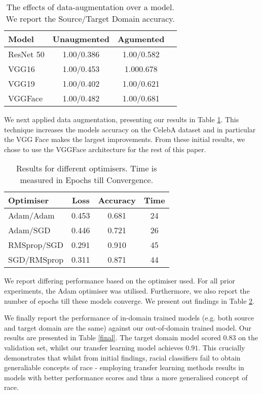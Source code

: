 \documentclass[10pt,twocolumn,letterpaper]{article}
\begin{document}
\begin{table}[h!]
\begin{center}
\begin{tabular}{|l|c|c|c|}
\hline
Model & Unaugmented & Agumented  \\
\hline\hline
ResNet 50 &1.00/0.386  & 1.00/0.582\\
VGG16 & 1.00/0.453 & 1.000.678\\
VGG19  &1.00/0.402 & 1.00/0.621\\
VGGFace & 1.00/0.482 & 1.00/0.681\\
\hline
\end{tabular}
\end{center}
\caption{The effects of data-augmentation over a model. We report the Source/Target Domain accuracy. \label{data agument}}
\end{table}

We next applied data augmentation, presenting our results in Table \ref{data agument}. This technique increases the models accuracy on the CelebA dataset and in particular the VGG Face makes the largest improvements. From these initial results, we chose to use the VGGFace architecture for the rest of this paper.

\begin{table}[h!]
\begin{center}
\begin{tabular}{|l|c|c|c|}
\hline
Optimiser&Loss &Accuracy &Time\\
\hline \hline
Adam/Adam& 0.453 & 0.681 &24\\
Adam/SGD &0.446 & 0.721&26\\
RMSprop/SGD&0.291 & 0.910&45\\
SGD/RMSprop&0.311 & 0.871&44\\
\hline
\end{tabular}
\end{center}
\caption{Results for different optimisers. Time is measured in Epochs till Convergence. \label{Table: Optimiser}}
\end{table}

We report differing performance based on the optimiser used. For all prior experiments, the Adam optimiser was utilised. Furthermore, we also report the number of epochs till these models converge. We present out findings in Table \ref{Table: Optimiser}.

We finally report the performance of in-domain trained models (e.g. both source and target domain are the same) against our out-of-domain trained model. Our results are presented in Table \ref{final}. The target domain model scored $0.83$ on the validation set, whilst our transfer learning model achieves $0.91$. This crucially demonstrates that whilst from initial findings, racial classifiers fail to obtain generaliable concepts of race - employing transfer learning methods results in models with better performance scores and thus a more generalised concept of race. 
\end{document}
